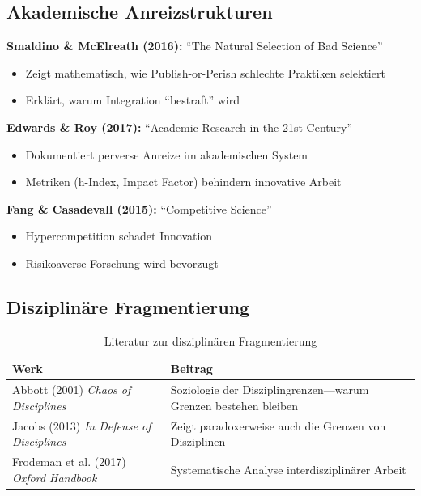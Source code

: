 \documentclass[12pt,a4paper]{article}
\begin{document}
\subsection{Akademische Anreizstrukturen}

\begin{tcolorbox}[colback=yellow!5!white, colframe=yellow!75!black,
    title=\textbf{Schlüsselliteratur: Akademische Incentives}]

\textbf{Smaldino \& McElreath (2016):} ``The Natural Selection of Bad Science''
\begin{itemize}[nosep]
\item Zeigt mathematisch, wie Publish-or-Perish schlechte Praktiken selektiert
\item Erklärt, warum Integration ``bestraft'' wird
\end{itemize}

\textbf{Edwards \& Roy (2017):} ``Academic Research in the 21st Century''
\begin{itemize}[nosep]
\item Dokumentiert perverse Anreize im akademischen System
\item Metriken (h-Index, Impact Factor) behindern innovative Arbeit
\end{itemize}

\textbf{Fang \& Casadevall (2015):} ``Competitive Science''
\begin{itemize}[nosep]
\item Hypercompetition schadet Innovation
\item Risikoaverse Forschung wird bevorzugt
\end{itemize}

\end{tcolorbox}

\subsection{Disziplinäre Fragmentierung}

\begin{table}[htbp]
\centering
\caption{Literatur zur disziplinären Fragmentierung}
\renewcommand{\arraystretch}{1.3}
\begin{tabular}{@{}lp{8cm}@{}}
\toprule
\textbf{Werk} & \textbf{Beitrag} \\
\midrule
Abbott (2001) \textit{Chaos of Disciplines} &
    Soziologie der Disziplingrenzen---warum Grenzen bestehen bleiben \\
Jacobs (2013) \textit{In Defense of Disciplines} &
    Zeigt paradoxerweise auch die Grenzen von Disziplinen \\
Frodeman et al. (2017) \textit{Oxford Handbook} &
    Systematische Analyse interdisziplinärer Arbeit \\
\bottomrule
\end{tabular}
\end{table}
\end{document}
